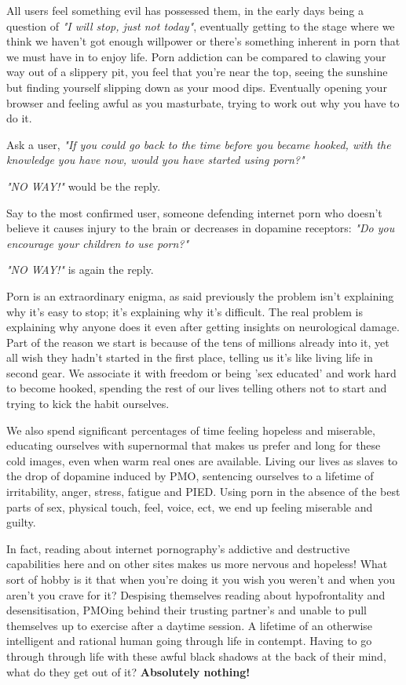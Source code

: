 \documentclass[easypeasy.tex]{subfiles}
\begin{document}
All users feel something evil has possessed them, in the early days being a question of \textit{"I will stop, just not today"}, eventually getting to the stage where we think we haven't got enough willpower or there's something inherent in porn that we must have in to enjoy life. Porn addiction can be compared to clawing your way out of a slippery pit, you feel that you're near the top, seeing the sunshine but finding yourself slipping down as your mood dips. Eventually opening your browser and feeling awful as you masturbate, trying to work out why you have to do it.

Ask a user, \textit{"If you could go back to the time before you became hooked, with the knowledge you have now, would you have started using porn?"}

\textit{"NO WAY!"} would be the reply.

Say to the most confirmed user, someone defending internet porn who doesn't believe it causes injury to the brain or decreases in dopamine receptors: \textit{"Do you encourage your children to use porn?"}

\textit{"NO WAY!"} is again the reply.

Porn is an extraordinary enigma, as said previously the problem isn't explaining why it's easy to stop; it's explaining why it's difficult. The real problem is explaining why anyone does it even after getting insights on neurological damage. Part of the reason we start is because of the tens of millions already into it, yet all wish they hadn't started in the first place, telling us it's like living life in second gear. We associate it with freedom or being 'sex educated' and work hard to become hooked, spending the rest of our lives telling others not to start and trying to kick the habit ourselves.

We also spend significant percentages of time feeling hopeless and miserable, educating ourselves with supernormal that makes us prefer and long for these cold images, even when warm real ones are available. Living our lives as slaves to the drop of dopamine induced by PMO, sentencing ourselves to a lifetime of irritability, anger, stress, fatigue and PIED. Using porn in the absence of the best parts of sex, physical touch, feel, voice, ect, we end up feeling miserable and guilty.

In fact, reading about internet pornography's addictive and destructive capabilities here and on other sites makes us more nervous and hopeless! What sort of hobby is it that when you're doing it you wish you weren't and when you aren't you crave for it? Despising themselves reading about hypofrontality and desensitisation, PMOing behind their trusting partner's and unable to pull themselves up to exercise after a daytime session. A lifetime of an otherwise intelligent and rational human going through life in contempt. Having to go through through life with these awful black shadows at the back of their mind, what do they get out of it? \textbf{Absolutely nothing!}
\end{document}
